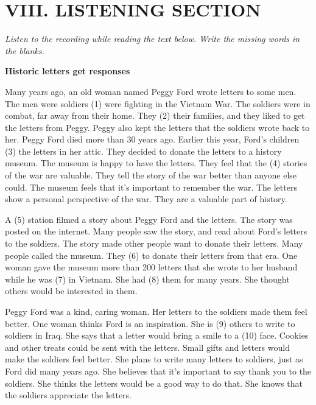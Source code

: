 \documentclass[11pt,a4paper]{article}
\begin{document}
\vspace{0.5cm}

\section{VIII. LISTENING SECTION}

\textit{Listen to the recording while reading the text below. Write the missing words in the blanks.}

\begin{center}
    \textbf{Historic letters get responses}
\end{center}

Many years ago, an old woman named Peggy Ford wrote letters to some men. The men were soldiers \underline{\hspace{2cm}} (1) were fighting in the Vietnam War. The soldiers were in combat, far away from their home. They \underline{\hspace{2cm}} (2) their families, and they liked to get the letters from Peggy. Peggy also kept the letters that the soldiers wrote back to her. Peggy Ford died more than 30 years ago. Earlier this year, Ford’s children \underline{\hspace{2cm}} (3) the letters in her attic. They decided to donate the letters to a history museum. The museum is happy to have the letters. They feel that the \underline{\hspace{2cm}} (4) stories of the war are valuable. They tell the story of the war better than anyone else could. The museum feels that it’s important to remember the war. The letters show a personal perspective of the war. They are a valuable part of history.

A \underline{\hspace{2cm}} (5) station filmed a story about Peggy Ford and the letters. The story was posted on the internet. Many people saw the story, and read about Ford’s letters to the soldiers. The story made other people want to donate their letters. Many people called the museum. They \underline{\hspace{2cm}} (6) to donate their letters from that era. One woman gave the museum more than 200 letters that she wrote to her husband while he was \underline{\hspace{2cm}} (7) in Vietnam. She had \underline{\hspace{2cm}} (8) them for many years. She thought others would be interested in them.

Peggy Ford was a kind, caring woman. Her letters to the soldiers made them feel better. One woman thinks Ford is an inspiration. She is \underline{\hspace{2cm}} (9) others to write to soldiers in Iraq. She says that a letter would bring a smile to a \underline{\hspace{2cm}} (10) face. Cookies and other treats could be sent with the letters. Small gifts and letters would make the soldiers feel better. She plans to write many letters to soldiers, just as Ford did many years ago. She believes that it’s important to say thank you to the soldiers. She thinks the letters would be a good way to do that. She knows that the soldiers appreciate the letters.
\end{document}

